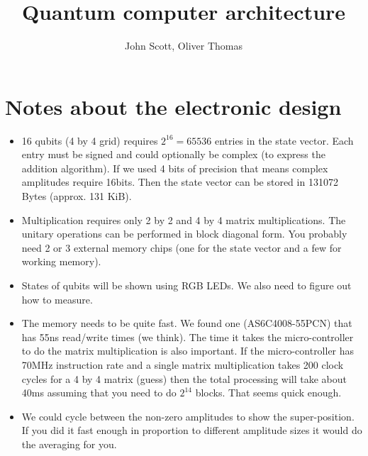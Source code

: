 \documentclass{article}
\begin{document}
\title{Quantum computer architecture}
 \author{John Scott, Oliver Thomas}
\maketitle


\section{Notes about the electronic design}

\begin{itemize}
    \item 16 qubits (4 by 4 grid) requires $2^{16}=65536$ entries in the state vector. Each entry must be signed and could optionally be complex (to express the addition algorithm). If we used 4 bits of precision that means complex amplitudes require 16bits. Then the state vector can be stored in 131072 Bytes (approx. 131 KiB).

\item Multiplication requires only 2 by 2 and 4 by 4 matrix multiplications. The unitary operations can be performed in block diagonal form. You probably need 2 or 3 external memory chips (one for the state vector and a few for working memory).

\item States of qubits will be shown using RGB LEDs. We also need to figure out how to measure.

\item The memory needs to be quite fast. We found one (AS6C4008-55PCN) that has 55ns
    read/write times (we think). The time it takes the micro-controller to do the matrix
    multiplication is also important. If the micro-controller has 70MHz instruction rate
    and a single matrix multiplication takes 200 clock cycles for a 4 by 4 matrix (guess)
    then the total processing will take about 40ms assuming that you need to do $2^{14}$ blocks. That seems quick enough.
  
\item We could cycle between the non-zero amplitudes to show the super-position. If you
    did it fast enough in proportion to different amplitude sizes it would do the
    averaging for you.
\end{itemize}
\end{document}
